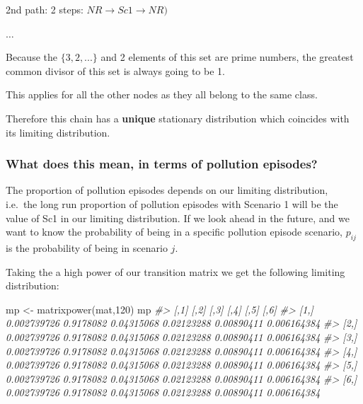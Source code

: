 \documentclass[
]{article}
\newenvironment{Shaded}{\begin{snugshade}}{\end{snugshade}}
\newcommand{\CommentTok}[1]{\textcolor[rgb]{0.56,0.35,0.01}{\textit{#1}}}
\newcommand{\DecValTok}[1]{\textcolor[rgb]{0.00,0.00,0.81}{#1}}
\newcommand{\FunctionTok}[1]{\textcolor[rgb]{0.00,0.00,0.00}{#1}}
\newcommand{\NormalTok}[1]{#1}
\newcommand{\OtherTok}[1]{\textcolor[rgb]{0.56,0.35,0.01}{#1}}
\begin{document}
2nd path: 2 steps: \(NR \rightarrow Sc1 \rightarrow NR)\)

\(\dots\)

Because the \(\{3,2,...\}\) and 2 elements of this set are prime
numbers, the greatest common divisor of this set is always going to be
1.

This applies for all the other nodes as they all belong to the same
class.

Therefore this chain has a \textbf{unique} stationary distribution which
coincides with its limiting distribution.

\hypertarget{what-does-this-mean-in-terms-of-pollution-episodes}{%
\subsubsection{What does this mean, in terms of pollution
episodes?}\label{what-does-this-mean-in-terms-of-pollution-episodes}}

The proportion of pollution episodes depends on our limiting
distribution, i.e.~the long run proportion of pollution episodes with
Scenario 1 will be the value of Sc1 in our limiting distribution. If we
look ahead in the future, and we want to know the probability of being
in a specific pollution episode scenario, \(p_{ij}\) is the probability
of being in scenario \(j\).

Taking the a high power of our transition matrix we get the following
limiting distribution:

\begin{Shaded}
\begin{Highlighting}[]
\NormalTok{mp }\OtherTok{\textless{}{-}} \FunctionTok{matrixpower}\NormalTok{(mat,}\DecValTok{120}\NormalTok{)}
\NormalTok{mp}
\CommentTok{\#\textgreater{}             [,1]      [,2]       [,3]       [,4]       [,5]        [,6]}
\CommentTok{\#\textgreater{} [1,] 0.002739726 0.9178082 0.04315068 0.02123288 0.00890411 0.006164384}
\CommentTok{\#\textgreater{} [2,] 0.002739726 0.9178082 0.04315068 0.02123288 0.00890411 0.006164384}
\CommentTok{\#\textgreater{} [3,] 0.002739726 0.9178082 0.04315068 0.02123288 0.00890411 0.006164384}
\CommentTok{\#\textgreater{} [4,] 0.002739726 0.9178082 0.04315068 0.02123288 0.00890411 0.006164384}
\CommentTok{\#\textgreater{} [5,] 0.002739726 0.9178082 0.04315068 0.02123288 0.00890411 0.006164384}
\CommentTok{\#\textgreater{} [6,] 0.002739726 0.9178082 0.04315068 0.02123288 0.00890411 0.006164384}
\end{Highlighting}
\end{Shaded}
\end{document}

